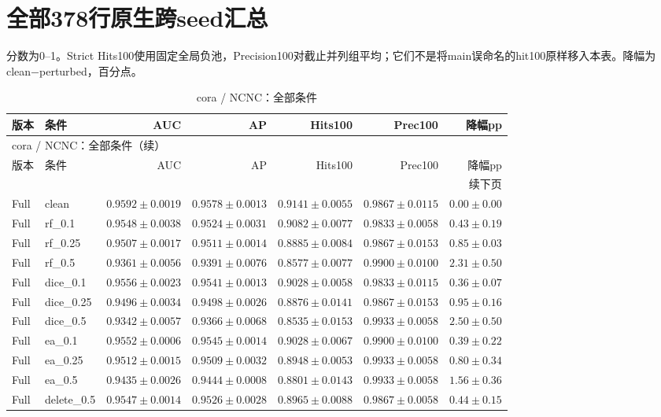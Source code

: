 \documentclass[UTF8,a4paper,11pt,fontset=fandol]{ctexart}
\begin{document}
\section{全部378行原生跨seed汇总}
分数为0--1。Strict Hits100使用固定全局负池，Precision100对截止并列组平均；它们不是将main误命名的hit100原样移入本表。降幅为clean−perturbed，百分点。
{\footnotesize
\setlength{\tabcolsep}{3pt}
\begin{longtable}{llrrrrr}
\caption{cora / NCNC：全部条件}\\
\toprule
版本 & 条件 & AUC & AP & Hits100 & Prec100 & 降幅pp \\
\midrule
\endfirsthead
\multicolumn{7}{l}{cora / NCNC：全部条件（续）}\\
\toprule
版本 & 条件 & AUC & AP & Hits100 & Prec100 & 降幅pp \\
\midrule
\endhead
\midrule\multicolumn{7}{r}{续下页}\\
\endfoot
\bottomrule\endlastfoot
Full & clean & $0.9592\pm0.0019$ & $0.9578\pm0.0013$ & $0.9141\pm0.0055$ & $0.9867\pm0.0115$ & $0.00\pm0.00$ \\
Full & rf\_0.1 & $0.9548\pm0.0038$ & $0.9524\pm0.0031$ & $0.9082\pm0.0077$ & $0.9833\pm0.0058$ & $0.43\pm0.19$ \\
Full & rf\_0.25 & $0.9507\pm0.0017$ & $0.9511\pm0.0014$ & $0.8885\pm0.0084$ & $0.9867\pm0.0153$ & $0.85\pm0.03$ \\
Full & rf\_0.5 & $0.9361\pm0.0056$ & $0.9391\pm0.0076$ & $0.8577\pm0.0077$ & $0.9900\pm0.0100$ & $2.31\pm0.50$ \\
Full & dice\_0.1 & $0.9556\pm0.0023$ & $0.9541\pm0.0013$ & $0.9028\pm0.0058$ & $0.9833\pm0.0115$ & $0.36\pm0.07$ \\
Full & dice\_0.25 & $0.9496\pm0.0034$ & $0.9498\pm0.0026$ & $0.8876\pm0.0141$ & $0.9867\pm0.0153$ & $0.95\pm0.16$ \\
Full & dice\_0.5 & $0.9342\pm0.0057$ & $0.9366\pm0.0068$ & $0.8535\pm0.0153$ & $0.9933\pm0.0058$ & $2.50\pm0.50$ \\
Full & ea\_0.1 & $0.9552\pm0.0006$ & $0.9545\pm0.0014$ & $0.9028\pm0.0067$ & $0.9900\pm0.0100$ & $0.39\pm0.22$ \\
Full & ea\_0.25 & $0.9512\pm0.0015$ & $0.9509\pm0.0032$ & $0.8948\pm0.0053$ & $0.9933\pm0.0058$ & $0.80\pm0.34$ \\
Full & ea\_0.5 & $0.9435\pm0.0026$ & $0.9444\pm0.0008$ & $0.8801\pm0.0143$ & $0.9933\pm0.0058$ & $1.56\pm0.36$ \\
Full & delete\_0.5 & $0.9547\pm0.0014$ & $0.9526\pm0.0028$ & $0.8965\pm0.0088$ & $0.9867\pm0.0058$ & $0.44\pm0.15$ \\

\end{longtable}}
\end{document}
